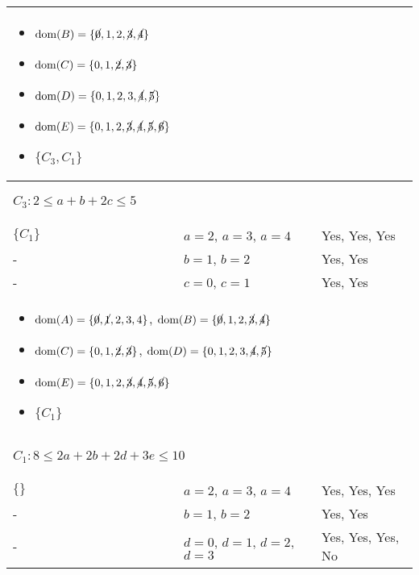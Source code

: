 \begin{example}
\begin{center}
\begin{tabular}{lll}
{\begin{itemize}
                \item $\text{dom}(B) = \{\cancel{0}, 1, 2, \cancel{3}, \cancel{4}\} $
                \item $\text{dom}(C) = \{0, 1, \cancel{2}, \cancel{3}\} $
                \item $\text{dom}(D) = \{0, 1, 2, 3, \cancel{4}, \cancel{5}\} $
                \item $\text{dom}(E) = \{0, 1, 2, \cancel{3}, \cancel{4}, \cancel{5}, \cancel{6}\} $
                \item $\{C_3,C_1\}$
            \end{itemize}} \\
            \midrule
            \multicolumn{3}{p{\linewidth}}{
            \begin{center}
                $C_3: 2 \leq a + b + 2c \leq 5$
            \end{center}} \\
            $\{C_1\}$ & $a=2$, $a=3$, $a=4$ & Yes, Yes, Yes \\
            - & $b=1$, $b=2$ & Yes, Yes \\
            - & $c=0$, $c=1$ & Yes, Yes \\
            \multicolumn{3}{p{\linewidth}}{
            \begin{itemize}
                \item $\text{dom}(A) = \{\cancel{0}, \cancel{1}, 2, 3, 4\}$, $\text{dom}(B) = \{\cancel{0}, 1, 2, \cancel{3}, \cancel{4}\} $
                \item $\text{dom}(C) = \{0, 1, \cancel{2}, \cancel{3}\} $, $\text{dom}(D) = \{0, 1, 2, 3, \cancel{4}, \cancel{5}\} $
                \item $\text{dom}(E) = \{0, 1, 2, \cancel{3}, \cancel{4}, \cancel{5}, \cancel{6}\} $
                \item $\{C_1\}$
            \end{itemize}} \\
            \midrule
            \multicolumn{3}{p{\linewidth}}{
            \begin{center}
                $C_1: 8 \leq 2a + 2b + 2d + 3e \leq 10$
            \end{center}} \\
            $\{\}$ & $a=2$, $a=3$, $a=4$ & Yes, Yes, Yes \\
            - & $b=1$, $b=2$ & Yes, Yes \\
            - & $d=0$, $d=1$, $d=2$, $d=3$ & Yes, Yes, Yes, No\\

\end{tabular}
\end{center}
\end{example}
